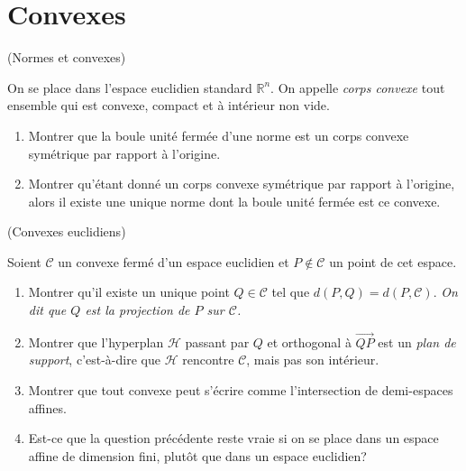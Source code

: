 \documentclass[a4paper,12pt,reqno]{amsart}
\begin{document}
\section{Convexes}

\begin{exo} (Normes et convexes)

    On se place dans l'espace euclidien standard $\mathbb{R}^{n}$. On appelle \emph{corps convexe} tout ensemble qui est convexe, compact et à intérieur non vide.
    \begin{enumerate}
       \item Montrer que la boule unité fermée d'une norme est un corps convexe symétrique par rapport à l'origine.

       \item Montrer qu'étant donné un corps convexe symétrique par rapport à l'origine, alors il existe une unique norme dont la boule unité fermée est ce convexe.

     \end{enumerate}
\end{exo}

\begin{exo} (Convexes euclidiens)

    Soient $\mathcal{C}$ un convexe fermé d'un espace euclidien et $P \notin \mathcal{C}$ un point de cet espace.
    \begin{enumerate}
       \item Montrer qu'il existe un unique point $Q \in \mathcal{C}$ tel que $d(P,Q) = d(P,\mathcal{C})$. \newline
       \emph{On dit que $Q$ est la projection de $P$ sur $\mathcal{C}$.}

       \item Montrer que l'hyperplan $\mathcal{H}$ passant par $Q$ et orthogonal à $\overrightarrow{QP}$ est un \emph{plan de support}, c'est-à-dire que $\mathcal{H}$ rencontre $\mathcal{C}$, mais pas son intérieur.

       \item Montrer que tout convexe peut s'écrire comme l'intersection de demi-espaces affines.

       \item Est-ce que la question précédente reste vraie si on se place dans un espace affine de dimension fini, plutôt que dans un espace euclidien?
     \end{enumerate}
\end{exo}
\end{document}
